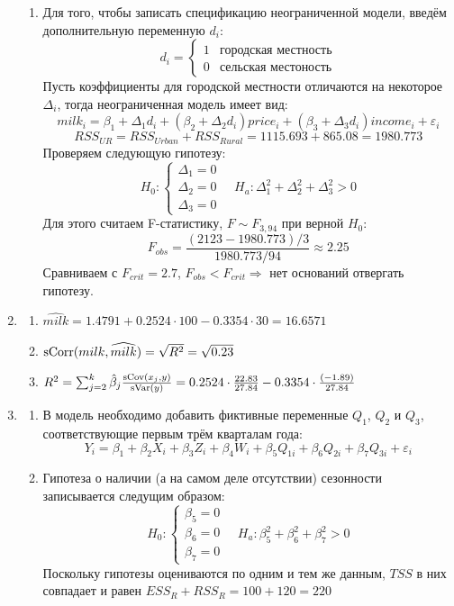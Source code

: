\documentclass[12pt, a4paper]{article}\usepackage[]{graphicx}\usepackage[]{color}
\begin{document}
\begin{enumerate}
\begin{enumerate}
\item Для того, чтобы записать спецификацию неограниченной модели, введём дополнительную переменную $d_i$:
\[
d_i = \begin{cases}
1 & \text{городская местность} \\
0 & \text{сельская местоность}
\end{cases}
\]
Пусть коэффициенты для городской местности отличаются на некоторое $\Delta_i$, тогда неограниченная модель имеет вид:
\[
milk_i = \beta_1 + \Delta_1 d_i + (\beta_2 + \Delta_2 d_i) price_i + (\beta_3 + \Delta_3 d_i) income_i + \varepsilon_i
\]
\[
RSS_{UR} = RSS_{Urban} + RSS_{Rural} = 1115.693 + 865.08 = 1980.773
\]
Проверяем следующую гипотезу:
\[
H_0: \begin{cases}
\Delta_1 = 0 \\
\Delta_2 = 0 \\
\Delta_3 = 0
\end{cases}
\quad
H_a: \Delta_1^2 + \Delta_2^2 + \Delta_3^2 >0
\]
Для этого считаем F-статистику, $F \sim F_{3, 94}$ при верной $H_0$:
\[
F_{obs} = \frac{(2123 - 1980.773)/3}{1980.773/94} \approx 2.25
\]
Сравниваем с $F_{crit} = 2.7$, $F_{obs} < F_{crit} \Rightarrow$ нет оснований отвергать гипотезу.
\end{enumerate}
\item
\begin{enumerate}
\item $\widehat{milk} = 1.4791 + 0.2524 \cdot 100 - 0.3354 \cdot 30 = 16.6571$
\item $\operatorname{sCorr}(milk, \widehat{milk}) = \sqrt{R^2} = \sqrt{0.23}$
\item $R^2 = \sum_{j=2}^{k} \hat{\beta}_j \frac{\operatorname{sCov}(x_j, y)}{\operatorname{sVar}(y)} = 0.2524 \cdot \frac{22.83}{27.84} - 0.3354 \cdot \frac{(-1.89)}{27.84}$
\end{enumerate}
\item
\begin{enumerate}
\item В модель необходимо добавить фиктивные переменные $Q_1$, $Q_2$ и $Q_3$, соответствующие первым трём кварталам года:
\[
Y_i = \beta_1 + \beta_2 X_i + \beta_3 Z_i + \beta_4 W_i + \beta_5 Q_{1i} + \beta_6 Q_{2i} + \beta_7 Q_{3i} + \varepsilon_i
\]
\item Гипотеза о наличии (а на самом деле отсутствии) сезонности записывается следущим образом:
\[
H_0: \begin{cases}
\beta_5 = 0 \\
\beta_6 = 0 \\
\beta_7 = 0
\end{cases}
\quad
H_{a}: \beta_5^2 + \beta_6^2 + \beta_7^2 > 0
\]
Поскольку гипотезы оцениваются по одним и тем же данным, $TSS$ в них совпадает и равен $ESS_{R} + RSS_{R} = 100 + 120 = 220$


\end{enumerate}
\end{enumerate}
\end{document}
